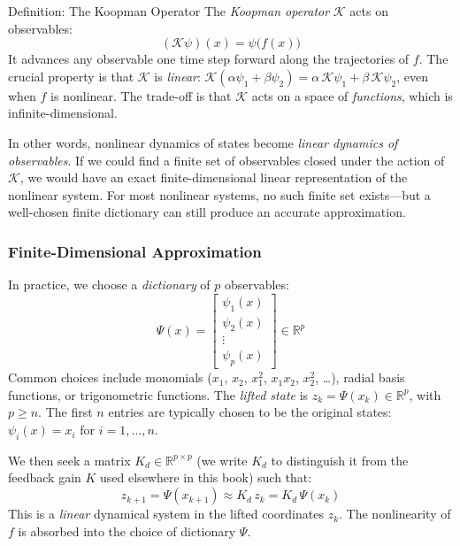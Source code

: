 \begin{defnbox}{Definition: The Koopman Operator}
	The \emph{Koopman operator} $\mathcal{K}$ acts on observables:
	\[
	(\mathcal{K}\psi)(x) = \psi\bigl(f(x)\bigr)
	\]
	It advances any observable one time step forward along the trajectories of $f$. The crucial property is that $\mathcal{K}$ is \emph{linear}: $\mathcal{K}(\alpha\psi_1 + \beta\psi_2) = \alpha\,\mathcal{K}\psi_1 + \beta\,\mathcal{K}\psi_2$, even when $f$ is nonlinear. The trade-off is that $\mathcal{K}$ acts on a space of \emph{functions}, which is infinite-dimensional.
\end{defnbox}

In other words, nonlinear dynamics of states become \emph{linear dynamics of observables}. If we could find a finite set of observables closed under the action of $\mathcal{K}$, we would have an exact finite-dimensional linear representation of the nonlinear system. For most nonlinear systems, no such finite set exists---but a well-chosen finite dictionary can still produce an accurate approximation.

\subsubsection*{Finite-Dimensional Approximation}

In practice, we choose a \emph{dictionary} of $p$ observables:
\[
\Psi(x) = \begin{bmatrix} \psi_1(x) \\ \psi_2(x) \\ \vdots \\ \psi_p(x) \end{bmatrix} \in \mathbb{R}^p
\]
Common choices include monomials ($x_1$, $x_2$, $x_1^2$, $x_1 x_2$, $x_2^2$, \ldots), radial basis functions, or trigonometric functions. The \emph{lifted state} is $z_k = \Psi(x_k) \in \mathbb{R}^p$, with $p \ge n$. The first $n$ entries are typically chosen to be the original states: $\psi_i(x) = x_i$ for $i = 1, \ldots, n$.

We then seek a matrix $K_d \in \mathbb{R}^{p \times p}$ (we write $K_d$ to distinguish it from the feedback gain $K$ used elsewhere in this book) such that:
\begin{equation}\label{eq:koopman_approx}
	z_{k+1} = \Psi(x_{k+1}) \approx K_d\,z_k = K_d\,\Psi(x_k)
\end{equation}
This is a \emph{linear} dynamical system in the lifted coordinates $z_k$. The nonlinearity of $f$ is absorbed into the choice of dictionary $\Psi$.

